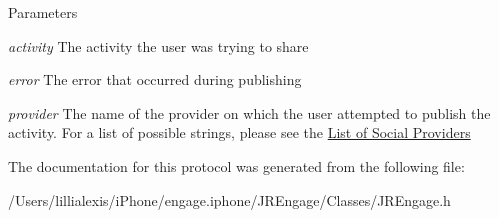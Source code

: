 \begin{DoxyParams}{Parameters}
\item[{\em activity}]The activity the user was trying to share\item[{\em error}]The error that occurred during publishing\item[{\em provider}]The name of the provider on which the user attempted to publish the activity. For a list of possible strings, please see the \hyperlink{_providers_socialProviders}{List of Social Providers} \end{DoxyParams}


The documentation for this protocol was generated from the following file:\begin{DoxyCompactItemize}
\item 
/Users/lillialexis/iPhone/engage.iphone/JREngage/Classes/JREngage.h\end{DoxyCompactItemize}
